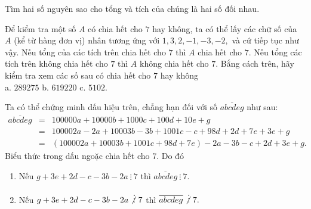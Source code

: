 \begin{vd}
	Tìm hai số nguyên sao cho tổng và tích của chúng là hai số đối nhau.
\end{vd}

\begin{vd}
	Để kiểm tra một số $A$ có chia hết cho $7$ hay không, ta có thể lấy các chữ số của $A$ (kể từ hàng đơn vị) nhân tương ứng với $1, 3, 2, -1, -3, -2,$ và cứ tiếp tục như vậy. Nếu tổng của các tích trên chia hết cho $7$ thì $A$ chia hết cho $7.$ Nếu tổng các tích trên không chia hết cho $7$ thì $A$ không chia hết cho $7.$ Bắng cách trên, hãy kiểm tra xem các số sau có chia hết cho $7$ hay không\\
	a. $289 275$ \;\;\;\;\;\;\; b. $619 220$ \;\;\;\;\;\;\; c. $5102.$
\end{vd}

\begin{note}
	Ta có thể chứng minh dấu hiệu trên, chẳng hạn đối với số $\overline{abc deg}$ như sau:
	{\allowdisplaybreaks
		\begin{eqnarray*}
			\overline{abc deg} &=& 100 000a + 10 000b + 1000c + 100d + 10e +g\\
			&=& 100 002a - 2a + 10 003b - 3b + 1001c - c + 98d + 2d +7e +3e +g\\
			&=& (100 002a + 10 003b + 1001c + 98d + 7e) - 2a - 3b -c + 2d + 3e +g.
		\end{eqnarray*}
	}
	Biểu thức trong dấu ngoặc chia hết cho $7.$ Do đó
	\begin{enumerate}
		\item Nếu $g + 3e + 2d - c - 3b - 2a \ \vdots \ 7$ thì $\overline{abc deg} \ \vdots \ 7.$
		\item Nếu $g + 3e + 2d - c - 3b - 2a \not \vdots \ 7$ thì $\overline{abc deg} \not \vdots \ 7.$
	\end{enumerate}
\end{note}

